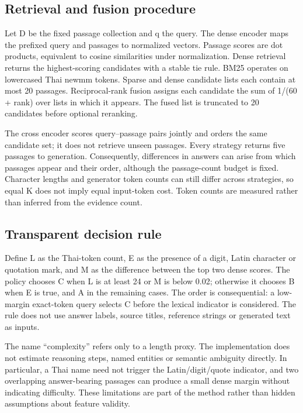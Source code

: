 \documentclass[10pt,a4paper]{article}
\begin{document}
\hypertarget{retrieval-and-fusion-procedure}{%
\subsection{Retrieval and fusion
procedure}\label{retrieval-and-fusion-procedure}}

Let D be the fixed passage collection and q the query. The dense encoder
maps the prefixed query and passages to normalized vectors. Passage
scores are dot products, equivalent to cosine similarities under
normalization. Dense retrieval returns the highest-scoring candidates
with a stable tie rule. BM25 operates on lowercased Thai newmm tokens.
Sparse and dense candidate lists each contain at most 20 passages.
Reciprocal-rank fusion assigns each candidate the sum of 1/(60 + rank)
over lists in which it appears. The fused list is truncated to 20
candidates before optional reranking.

The cross encoder scores query--passage pairs jointly and orders the
same candidate set; it does not retrieve unseen passages. Every strategy
returns five passages to generation. Consequently, differences in
answers can arise from which passages appear and their order, although
the passage-count budget is fixed. Character lengths and generator token
counts can still differ across strategies, so equal K does not imply
equal input-token cost. Token counts are measured rather than inferred
from the evidence count.

\hypertarget{transparent-decision-rule}{%
\subsection{Transparent decision
rule}\label{transparent-decision-rule}}

Define L as the Thai-token count, E as the presence of a digit, Latin
character or quotation mark, and M as the difference between the top two
dense scores. The policy chooses C when L is at least 24 or M is below
0.02; otherwise it chooses B when E is true, and A in the remaining
cases. The order is consequential: a low-margin exact-token query
selects C before the lexical indicator is considered. The rule does not
use answer labels, source titles, reference strings or generated text as
inputs.

The name ``complexity'' refers only to a length proxy. The
implementation does not estimate reasoning steps, named entities or
semantic ambiguity directly. In particular, a Thai name need not trigger
the Latin/digit/quote indicator, and two overlapping answer-bearing
passages can produce a small dense margin without indicating difficulty.
These limitations are part of the method rather than hidden assumptions
about feature validity.
\end{document}
